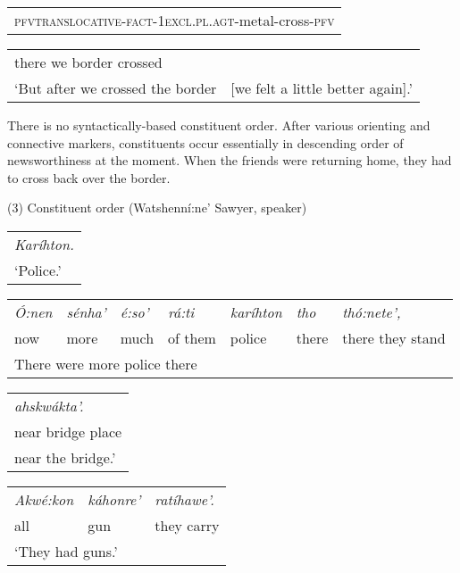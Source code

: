 \documentclass[output=paper,colorlinks,citecolor=brown
]{langscibook}
\begin{document}
\begin{tabular}{l} 
\textsc{pfv}\textsc{translocative-fact-1excl.pl.agt}-metal-cross-\textsc{pfv}\\
\end{tabular}

\begin{tabular}{ll} 
there we border crossed\\
`But after we crossed the border&{[}we felt a little better again{]}.'
\end{tabular}\bigskip

There is no syntactically-based constituent order. After various orienting and connective markers, constituents occur essentially in descending order of newsworthiness at the moment. When the friends were returning home, they had to cross back over the border.
\bigskip

(3) Constituent order (Watshenní:ne' Sawyer, speaker)

\begin{tabular}{l}
\emph{Karíhton.}\\

`Police.'\\
\end{tabular}\bigskip

\begin{tabular}{lllllll}
\emph{Ó:nen}&\emph{sénha'} & \emph{é:so'} & \emph{rá:ti} & \emph{karíhton}&\emph{tho}&\emph{thó:nete',}\\
now & more & much & of them & police & there & there they stand\\
\multicolumn{7}{l}{There were more police there}
\\

\end{tabular}\bigskip


\begin{tabular}{l}
\emph{ahskwákta'.}\\

near bridge place\\

near the bridge.'\\
\end{tabular}\bigskip

\begin{tabular}{lll}

\emph{Akwé:kon}&\emph{káhonre'}&\emph{ratíhawe'.}\\

all& gun & they carry\\
\multicolumn{3}{l}{`They had guns.'}\\
\end{tabular}\bigskip
\end{document}
